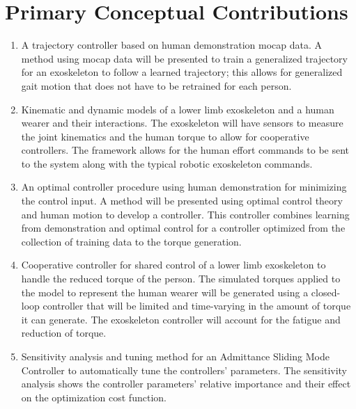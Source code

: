 \section{Primary Conceptual Contributions}
\begin{enumerate}[wide, nosep, labelindent = 0pt, topsep = 1ex]
     \item A trajectory controller based on human demonstration mocap data. A method using mocap data will be presented to train a generalized trajectory for an exoskeleton to follow a learned trajectory; this allows for generalized gait motion that does not have to be retrained for each person. 
    \item  Kinematic and dynamic models of a lower limb exoskeleton and a human wearer and their interactions. The exoskeleton will have sensors to measure the joint kinematics and the human torque to allow for cooperative controllers. The framework allows for the human effort commands to be sent to the system along with the typical robotic exoskeleton commands. 
    \item An optimal controller procedure using human demonstration for minimizing the control input. A method will be presented using optimal control theory and human motion to develop a controller. This controller combines learning from demonstration and optimal control for a controller optimized from the collection of training data to the torque generation. 
    \item Cooperative controller for shared control of a lower limb exoskeleton to handle the reduced torque of the person. The simulated torques applied to the model to represent the human wearer will be generated using a closed-loop controller that will be limited and time-varying in the amount of torque it can generate. The exoskeleton controller will account for the fatigue and reduction of torque. 
    \item Sensitivity analysis and tuning method for an Admittance Sliding Mode Controller to automatically tune the controllers' parameters. The sensitivity analysis shows the controller parameters' relative importance and their effect on the optimization cost function.  
\end{enumerate}

